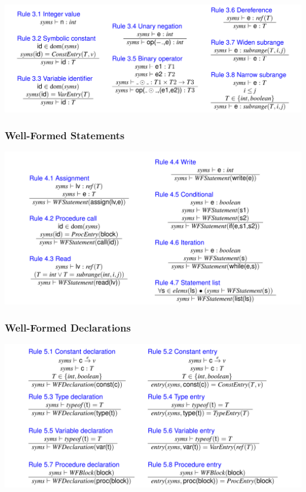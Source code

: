 \documentclass[10pt,a4paper,]{article}
\begin{document}
\includegraphics{assets/image-20200703200702094.png}

\hypertarget{well-formed-statements}{%
\subsubsection{Well-Formed Statements}\label{well-formed-statements}}

\includegraphics{assets/image-20200703200722065.png}

\hypertarget{well-formed-declarations}{%
\subsubsection{Well-Formed
Declarations}\label{well-formed-declarations}}

\includegraphics{assets/image-20200703200753360.png}
\end{document}
